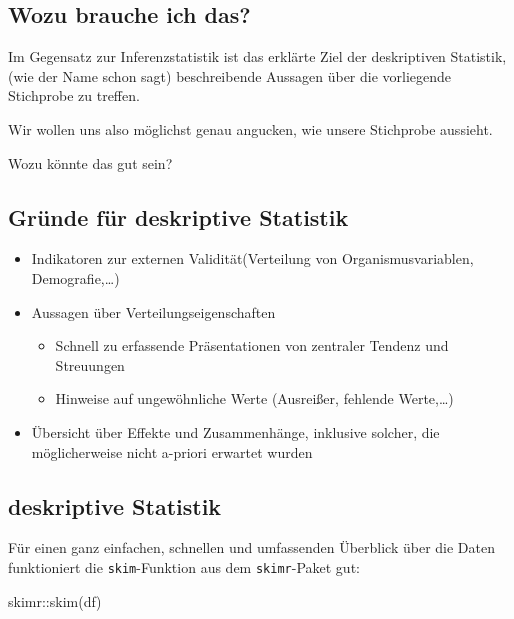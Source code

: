 \documentclass[
]{book}
\newenvironment{Shaded}{\begin{snugshade}}{\end{snugshade}}
\newcommand{\FunctionTok}[1]{\textcolor[rgb]{0.00,0.00,0.00}{#1}}
\newcommand{\NormalTok}[1]{#1}
\newcommand{\SpecialCharTok}[1]{\textcolor[rgb]{0.00,0.00,0.00}{#1}}
\providecommand{\tightlist}{%
  \setlength{\itemsep}{0pt}\setlength{\parskip}{0pt}}
\begin{document}
\hypertarget{wozu-brauche-ich-das}{%
\subsection{Wozu brauche ich das?}\label{wozu-brauche-ich-das}}

Im Gegensatz zur Inferenzstatistik ist das erklärte Ziel der deskriptiven Statistik, (wie der Name schon sagt) beschreibende Aussagen über die vorliegende Stichprobe zu treffen.

Wir wollen uns also möglichst genau angucken, wie unsere Stichprobe aussieht.

Wozu könnte das gut sein?

\hypertarget{gruxfcnde-fuxfcr-deskriptive-statistik}{%
\subsection{Gründe für deskriptive Statistik}\label{gruxfcnde-fuxfcr-deskriptive-statistik}}

\begin{itemize}
\item
  Indikatoren zur externen Validität(Verteilung von Organismusvariablen, Demografie,\ldots)
\item
  Aussagen über Verteilungseigenschaften

  \begin{itemize}
  \tightlist
  \item
    Schnell zu erfassende Präsentationen von zentraler Tendenz und Streuungen
  \item
    Hinweise auf ungewöhnliche Werte (Ausreißer, fehlende Werte,\ldots)
  \end{itemize}
\item
  Übersicht über Effekte und Zusammenhänge, inklusive solcher, die möglicherweise nicht a-priori erwartet wurden
\end{itemize}

\hypertarget{deskriptive-statistik-1}{%
\subsection{deskriptive Statistik}\label{deskriptive-statistik-1}}

Für einen ganz einfachen, schnellen und umfassenden Überblick über die Daten funktioniert die \texttt{skim}-Funktion aus dem \texttt{skimr}-Paket gut:

\begin{Shaded}
\begin{Highlighting}[]
\NormalTok{skimr}\SpecialCharTok{::}\FunctionTok{skim}\NormalTok{(df)}
\end{Highlighting}
\end{Shaded}
\end{document}

